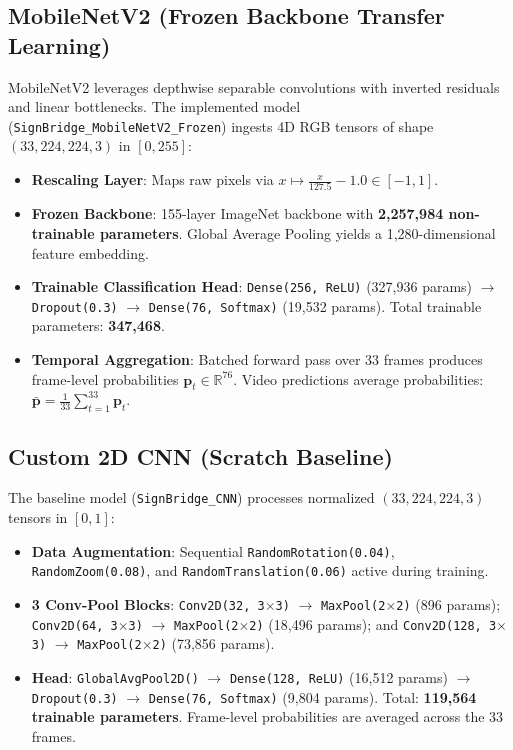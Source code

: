 \subsection{MobileNetV2 (Frozen Backbone Transfer Learning)}
MobileNetV2 \cite{sandler2018mobilenetv2} leverages depthwise separable convolutions with inverted residuals and linear bottlenecks. The implemented model (\texttt{SignBridge\_MobileNetV2\_Frozen}) ingests 4D RGB tensors of shape $(33, 224, 224, 3)$ in $[0, 255]$:
\begin{itemize}
    \item \textbf{Rescaling Layer}: Maps raw pixels via $x \mapsto \frac{x}{127.5} - 1.0 \in [-1, 1]$.
    \item \textbf{Frozen Backbone}: 155-layer ImageNet backbone with \textbf{2,257,984 non-trainable parameters}. Global Average Pooling yields a 1,280-dimensional feature embedding.
    \item \textbf{Trainable Classification Head}: \texttt{Dense(256, ReLU)} (327,936 params) $\to$ \texttt{Dropout(0.3)} \cite{srivastava2014dropout} $\to$ \texttt{Dense(76, Softmax)} (19,532 params). Total trainable parameters: \textbf{347,468}.
    \item \textbf{Temporal Aggregation}: Batched forward pass over 33 frames produces frame-level probabilities $\mathbf{p}_t \in \mathbb{R}^{76}$. Video predictions average probabilities: $\bar{\mathbf{p}} = \frac{1}{33} \sum_{t=1}^{33} \mathbf{p}_t$.
\end{itemize}

\subsection{Custom 2D CNN (Scratch Baseline)}
The baseline model (\texttt{SignBridge\_CNN}) processes normalized $(33, 224, 224, 3)$ tensors in $[0, 1]$:
\begin{itemize}
    \item \textbf{Data Augmentation}: Sequential \texttt{RandomRotation(0.04)}, \texttt{RandomZoom(0.08)}, and \texttt{RandomTranslation(0.06)} active during training.
    \item \textbf{3 Conv-Pool Blocks}: \texttt{Conv2D(32, 3$\times$3)} $\to$ \texttt{MaxPool(2$\times$2)} (896 params); \texttt{Conv2D(64, 3$\times$3)} $\to$ \texttt{MaxPool(2$\times$2)} (18,496 params); and \texttt{Conv2D(128, 3$\times$3)} $\to$ \texttt{MaxPool(2$\times$2)} (73,856 params).
    \item \textbf{Head}: \texttt{GlobalAvgPool2D()} $\to$ \texttt{Dense(128, ReLU)} (16,512 params) $\to$ \texttt{Dropout(0.3)} $\to$ \texttt{Dense(76, Softmax)} (9,804 params). Total: \textbf{119,564 trainable parameters}. Frame-level probabilities are averaged across the 33 frames.
\end{itemize}

